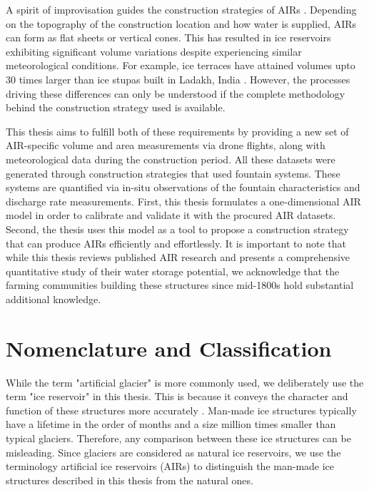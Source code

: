A spirit of improvisation guides the construction strategies of AIRs \cite{clouseLadakhArtificialGlaciers2017}.
Depending on the topography of the construction location and how water is supplied, AIRs can form as flat sheets
or vertical cones. This has resulted in ice reservoirs exhibiting significant volume variations despite
experiencing similar meteorological conditions. For example, ice terraces have attained volumes upto 30 times
larger than ice stupas built in Ladakh, India \cite{nusserSociohydrologyArtificialGlaciers2019}. However, the
processes driving these differences can only be understood if the complete methodology behind the construction
strategy used is available.

This thesis aims to fulfill both of these requirements by providing a new set of AIR-specific volume and area
measurements via drone flights, along with meteorological data during the construction period. All these
datasets were generated through construction strategies that used fountain systems. These systems are quantified via in-situ
observations of the fountain characteristics and discharge rate measurements. First, this thesis
formulates a one-dimensional AIR model in order to calibrate and validate it with the procured AIR datasets.
Second, the thesis uses this model as a tool to propose a construction strategy that can produce AIRs
efficiently and effortlessly. It is important to note that while this thesis reviews published AIR research and
presents a comprehensive quantitative study of their water storage potential, we acknowledge that the farming
communities building these structures since mid-1800s hold substantial additional knowledge.


\section{Nomenclature and Classification}

While the term "artificial glacier" is more commonly used, we deliberately use the term "ice reservoir" in this
thesis. This is because it conveys the character and function of these structures more accurately
\citep{nusserSociohydrologyArtificialGlaciers2019}. Man-made ice structures typically have a lifetime in the
order of months and a size million times smaller than typical glaciers. Therefore, any comparison between these
ice structures can be misleading. Since glaciers are considered as natural ice reservoirs, we use the
terminology artificial ice reservoirs (AIRs) to distinguish the man-made ice structures described in this thesis
from the natural ones. 


